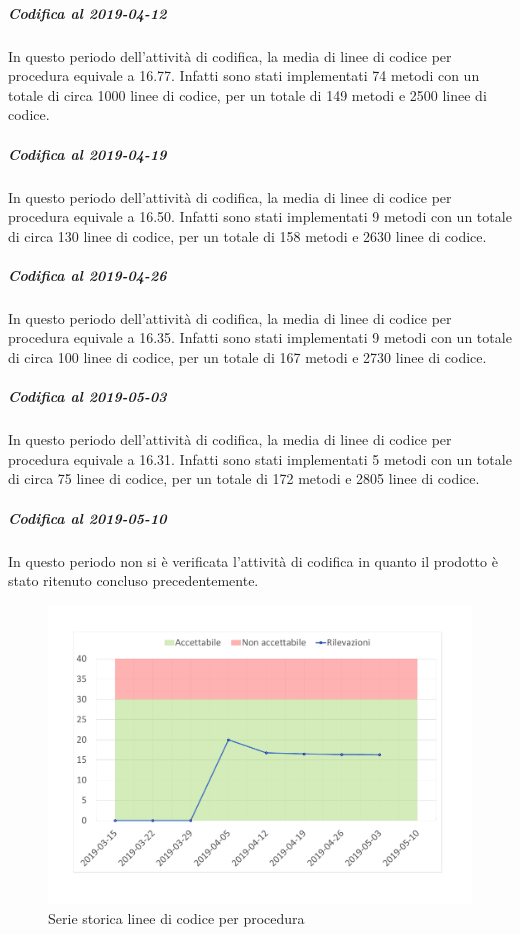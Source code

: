 \subparagraph{Codifica al 2019-04-12}
In questo periodo dell'attività di codifica, la media di linee di codice per procedura equivale a 16.77. Infatti sono stati implementati 74 metodi con un totale di circa 1000 linee di codice, per un totale di 149 metodi e 2500 linee di codice.

\subparagraph{Codifica al 2019-04-19}
In questo periodo dell'attività di codifica, la media di linee di codice per procedura equivale a 16.50. Infatti sono stati implementati 9 metodi con un totale di circa 130 linee di codice, per un totale di 158 metodi e 2630 linee di codice.

\subparagraph{Codifica al 2019-04-26}
In questo periodo dell'attività di codifica, la media di linee di codice per procedura equivale a 16.35. Infatti sono stati implementati 9 metodi con un totale di circa 100 linee di codice, per un totale di 167 metodi e 2730 linee di codice.

\subparagraph{Codifica al 2019-05-03}
In questo periodo dell'attività di codifica, la media di linee di codice per procedura equivale a 16.31. Infatti sono stati implementati 5 metodi con un totale di circa 75 linee di codice, per un totale di 172 metodi e 2805 linee di codice.

\subparagraph{Codifica al 2019-05-10}
In questo periodo non si è verificata l'attività di codifica in quanto il prodotto è stato ritenuto concluso precedentemente.

\begin{figure}[H]
	\centering
	\includegraphics[scale=0.6]{images/resoconto/MPS10Chart.pdf}
	\caption{Serie storica linee di codice per procedura}	
\end{figure}

